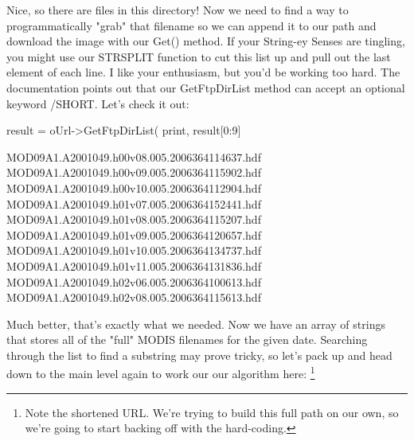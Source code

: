 \documentclass{book}
\newcommand{\codefill}{\centering$\longrightarrow$\hfill{\color{gray}\rule[0.1\baselineskip]{0.5\linewidth}{2pt}}\hfill$\longleftarrow$}
\newcounter{highlight}[page]
\newcommand{\tikzhighlightanchor}[1]{\ensuremath{\vcenter{\hbox{\tikz[remember picture, overlay]{\coordinate (#1 highlight \arabic{highlight});}}}}}
\newcommand{\bh}[0]{\stepcounter{highlight}\tikzhighlightanchor{begin}}
\newcommand{\eh}[0]{\tikzhighlightanchor{end}}
\theoremstyle{aside_style}
\begin{document}
Nice, so there are files in this directory!
Now we need to find a way to programmatically "grab" that filename so we can append it to our path and download the image with our Get() method.
If your String-ey Senses are tingling, you might use our STRSPLIT function to cut this list up and pull out the last element of each line.
I like your enthusiasm, but you'd be working too hard.
The documentation points out that our GetFtpDirList method can accept an optional keyword /SHORT. Let's check it out:

\begin{idl}
result = oUrl->GetFtpDirList(%
print, result[0:9]
\end{idl}

MOD09A1.A2001049.h00v08.005.2006364114637.hdf\\
MOD09A1.A2001049.h00v09.005.2006364115902.hdf\\
MOD09A1.A2001049.h00v10.005.2006364112904.hdf\\
MOD09A1.A2001049.h01v07.005.2006364152441.hdf\\
MOD09A1.A2001049.h01v08.005.2006364115207.hdf\\
MOD09A1.A2001049.h01v09.005.2006364120657.hdf\\
MOD09A1.A2001049.h01v10.005.2006364134737.hdf\\
MOD09A1.A2001049.h01v11.005.2006364131836.hdf\\
MOD09A1.A2001049.h02v06.005.2006364100613.hdf\\
MOD09A1.A2001049.h02v08.005.2006364115613.hdf


Much better, that's exactly what we needed. Now we have an array of strings that stores all of the "full" MODIS filenames for the given date.
Searching through the list to find a substring may prove tricky, so let's pack up and head down to the main level again to work our our algorithm here:
\footnote{Note the shortened URL. We're trying to build this full path on our own, so we're going to start backing off with the hard-coding.}

\end{document}
